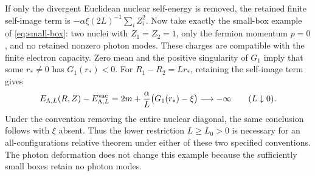 \begin{remark}
If only the divergent Euclidean nuclear self-energy is removed, the
retained finite self-image term is
\(-\alpha\xi(2L)^{-1}\sum_iZ_i^2\). Now take exactly the small-box example
of \eqref{eq:small-box}: two nuclei with \(Z_1=Z_2=1\), only the fermion
momentum \(p=0\), and no retained nonzero photon modes. These charges are
compatible with the finite electron capacity. Zero mean and the positive
singularity of \(G_1\) imply that some \(r_*\ne0\) has \(G_1(r_*)<0\).
For \(R_1-R_2=Lr_*\), retaining the self-image term gives
\[
 E_{\Lambda,L}(R,Z)-E^{\mathrm{vac}}_{\Lambda,L}
 =2m+\frac\alpha L\bigl(G_1(r_*)-\xi\bigr)
 \longrightarrow-\infty\qquad(L\downarrow0).
\]
Under the convention removing the entire nuclear diagonal, the same
conclusion follows with \(\xi\) absent. Thus the lower restriction
\(L\geq L_0>0\) is necessary for an all-configurations relative theorem
under either of these two specified conventions. The photon deformation
does not change this example because the sufficiently small boxes retain
no photon modes.
\end{remark}
